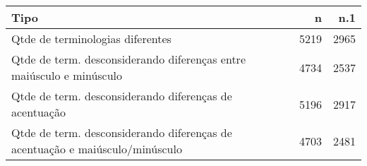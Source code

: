 \begin{table}[ht]
\centering
\begin{tabular}{lrr}
  \hline
Tipo & n & n.1 \\ 
  \hline
Qtde de terminologias diferentes & 5219 & 2965 \\ 
  Qtde de term. desconsiderando diferenças entre maiúsculo e minúsculo & 4734 & 2537 \\ 
  Qtde de term. desconsiderando diferenças de acentuação & 5196 & 2917 \\ 
  Qtde de term. desconsiderando diferenças de acentuação e
          maiúsculo/minúsculo & 4703 & 2481 \\ 
   \hline
\end{tabular}
\end{table}
